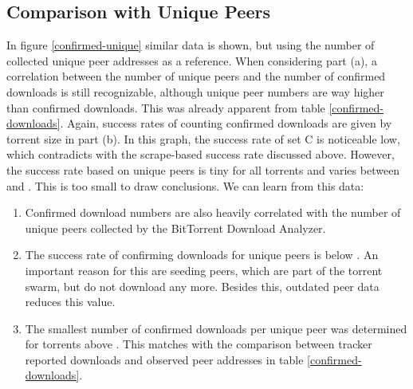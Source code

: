 \documentclass[10pt, a4paper, twoside=false, headsepline]{scrbook}
\renewcommand{\_}{\origunderscore\allowbreak}
\begin{document}
\subsection{Comparison with Unique Peers}
In figure \ref{confirmed-unique} similar data is shown, but using the number of collected unique peer addresses as a reference. When considering part (a), a correlation between the number of unique peers and the number of confirmed downloads is still recognizable, although unique peer numbers are way higher than confirmed downloads. This was already apparent from table \ref{confirmed-downloads}. Again, success rates of counting confirmed downloads are given by torrent size in part (b). In this graph, the success rate of set C is noticeable low, which contradicts with the scrape-based success rate discussed above. However, the success rate based on unique peers is tiny for all torrents and varies between  and . This is too small to draw conclusions. We can learn from this data:
\begin{enumerate}
\item Confirmed download numbers are also heavily correlated with the number of unique peers collected by the BitTorrent Download Analyzer.
\item The success rate of confirming downloads for unique peers is below . An important reason for this are seeding peers, which are part of the torrent swarm, but do not download any more. Besides this, outdated peer data reduces this value.
\item The smallest number of confirmed downloads per unique peer was determined for torrents above . This matches with the comparison between tracker reported downloads and observed peer addresses in table \ref{confirmed-downloads}.
\end{enumerate}
\end{document}
